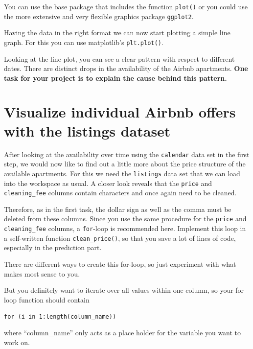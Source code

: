 \documentclass[
  11pt,
]{book}
\newenvironment{tips}[1]
  {
  \begin{itemize}
  \footnotesize
  \renewcommand{\labelitemi}{
    \raisebox{-.7\height}[0pt][0pt]{
      {\setkeys{Gin}{width=3em,keepaspectratio}
        \texttt{[image: images/\#1.png]}}
    }
  }
  \setlength{\fboxsep}{1em}
  \begin{rbox}
  \item
  }
  {
  \end{rbox}
  \end{itemize}
  }
\newenvironment{tipsp}[1]
  {
  \begin{itemize}
  \footnotesize
  \renewcommand{\labelitemi}{
    \raisebox{-.7\height}[0pt][0pt]{
      {\setkeys{Gin}{width=3em,keepaspectratio}
        \texttt{[image: images/\#1.png]}}
    }
  }
  \setlength{\fboxsep}{1em}
  \begin{pbox}
  \item
  }
  {
  \end{pbox}
  \end{itemize}
  }
\begin{document}
\begin{tips}r

You can use the base package that includes the function \texttt{plot()} or you could use the more extensive and very flexible graphics package \texttt{ggplot2}.

\end{tips}

\begin{tipsp}p

Having the data in the right format we can now start plotting a simple line graph. For this you can use matplotlib's \texttt{plt.plot()}.

\end{tipsp}

Looking at the line plot, you can see a clear pattern with respect to different dates. There are distinct drops in the availability of the Airbnb apartments. \textbf{One task for your project is to explain the cause behind this pattern.}

\hypertarget{visualize-individual-airbnb-offers-with-the-listings-dataset}{%
\section{Visualize individual Airbnb offers with the listings dataset}\label{visualize-individual-airbnb-offers-with-the-listings-dataset}}

After looking at the availability over time using the \texttt{calendar} data set in the first step, we would now like to find out a little more about the price structure of the available apartments. For this we need the \texttt{listings} data set that we can load into the workspace as usual. A closer look reveals that the \texttt{price} and \texttt{cleaning\_fee} columns contain characters and once again need to be cleaned.

Therefore, as in the first task, the dollar sign as well as the comma must be deleted from these columns. Since you use the same procedure for the \texttt{price} and \texttt{cleaning\_fee} columns, a \texttt{for}-loop is recommended here. Implement this loop in a self-written function \texttt{clean\_price()}, so that you save a lot of lines of code, especially in the prediction part.

\begin{tips}r

There are different ways to create this for-loop, so just experiment with what makes most sense to you.

But you definitely want to iterate over all values within one column, so your for-loop function should contain

\texttt{for\ (i\ in\ 1:length(column\_name))}

where ``column\_name'' only acts as a place holder for the variable you want to work on.

\end{tips}
\end{document}
